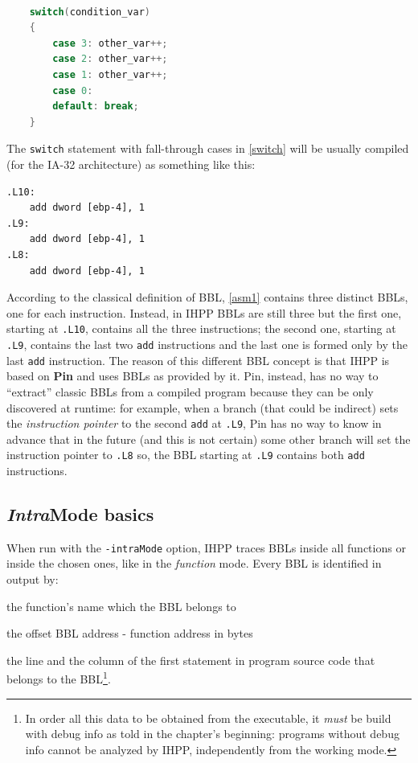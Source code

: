 \documentclass[a4paper,11pt]{report}
\begin{document}
\begin{lstlisting}[language=C, 
	caption={a switch statement}, label=switch, frame=leftline]

    switch(condition_var)
    {
        case 3: other_var++;
        case 2: other_var++;
        case 1: other_var++;
        case 0:
        default: break;
    }

\end{lstlisting}

\noindent
The \verb|switch| statement with fall-through cases in \cref{switch} 
will be usually compiled (for the IA-32 architecture) as something like this:

\begin{lstlisting}[language={[x86masm]Assembler}, 
	frame=leftline, label=asm1, caption={assembly code relative to \cref{switch}}]
.L10:
	add dword [ebp-4], 1
.L9:
	add dword [ebp-4], 1
.L8:
	add dword [ebp-4], 1
\end{lstlisting}

\noindent
According to the classical definition of BBL, \cref{asm1} contains three distinct BBLs, one for each instruction. Instead, in IHPP BBLs are still three but the first one, starting at \verb|.L10|, contains all the three instructions; the second one, starting at \verb|.L9|, contains the last two \verb|add| instructions and the last one is formed only by the 
last \verb|add| instruction. The reason of this different BBL concept is that 
IHPP is based on \textbf{Pin} and uses BBLs as provided by it. 
Pin, instead, has no way to ``extract'' classic BBLs from a compiled program because 
they can be only discovered at runtime: for example, when a branch (that could be indirect) sets the \emph{instruction pointer} to the second \verb|add| at \verb|.L9|, 
Pin has no way to know in advance that in the future (and this is not certain) some 
other branch will set the instruction pointer to \verb|.L8| so, the BBL starting at \verb|.L9| contains both \verb|add| instructions.

\subsection{\emph{Intra}Mode basics}

When run with the \verb|-intraMode| option, IHPP traces BBLs inside all functions or inside the chosen ones, like in the \emph{function} mode. Every BBL is identified in output by: 
\begin{itemize*}
\item the function's name which the BBL belongs to
\item the offset BBL address - function address in bytes
\item the line and the column of the first 
statement in program source code that belongs to the BBL\footnote{In order all this data to be obtained from the executable, it \emph{must} be build 
with debug info as told in the chapter's beginning: programs without debug info 
cannot be analyzed by IHPP, independently from the working mode.}.
\end{itemize*}
\end{document}
